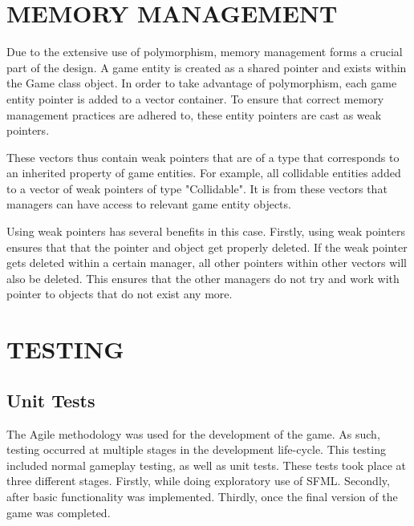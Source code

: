 \documentclass[10pt,twocolumn]{witseiepaper}
\begin{document}
%

%
\section{MEMORY MANAGEMENT} %

Due to the extensive use of polymorphism, memory management forms a crucial part of the design. A game entity is created as a shared pointer and exists within the Game class object. In order to take advantage of polymorphism, each game entity pointer is added to a vector container. To ensure that correct memory management practices are adhered to, these entity pointers are cast as weak pointers. 

These vectors thus contain weak pointers that are of a type that corresponds to an inherited property of game entities. For example, all collidable entities added to a vector of weak pointers of type "Collidable". It is from these vectors that managers can have access to relevant game entity objects.

Using weak pointers has several benefits in this case. Firstly, using weak pointers ensures that that the pointer and object get properly deleted. If the weak pointer gets deleted within a certain manager, all other pointers within other vectors will also be deleted. This ensures that the other managers do not try and work with pointer to objects that do not exist any more.




%
\section{TESTING} %

\subsection{Unit Tests}
The Agile methodology was used for the development of the game. As such, testing occurred at multiple stages in the development life-cycle. This testing included normal gameplay testing, as well as unit tests. These tests took place at three different stages. Firstly, while doing exploratory use of SFML. Secondly, after basic functionality was implemented. Thirdly, once the final version of the game was completed.
\end{document}
